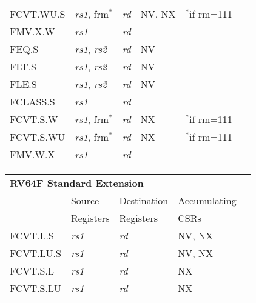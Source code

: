 \begin{tabular}{p{3cm}|p{25mm}|p{3cm}|p{4cm}|p{4cm}}
   \cline{2-4}
   FCVT.WU.S & {\em rs1}, frm$^*$ & {\em rd} & NV, NX & $^*$if rm=111  \\
   \cline{2-4}
   FMV.X.W & {\em rs1} & {\em rd} &   & \\
   \cline{2-4}
   FEQ.S & {\em rs1}, {\em rs2} & {\em rd} & NV &   \\
   \cline{2-4}
   FLT.S & {\em rs1}, {\em rs2} & {\em rd} & NV &   \\
   \cline{2-4}
   FLE.S & {\em rs1}, {\em rs2} & {\em rd} & NV &   \\
   \cline{2-4}
   FCLASS.S & {\em rs1} & {\em rd} &   & \\
   \cline{2-4}
   FCVT.S.W & {\em rs1}, frm$^*$ & {\em rd} & NX & $^*$if rm=111  \\
   \cline{2-4}
   FCVT.S.WU & {\em rs1}, frm$^*$ & {\em rd} & NX & $^*$if rm=111  \\
   \cline{2-4}
   FMV.W.X & {\em rs1} & {\em rd} &   & \\
   \cline{2-4}
\end{tabular}

\begin{tabular}{p{3cm}|p{25mm}|p{3cm}|p{4cm}|p{4cm}}
  \multicolumn{4}{l}{\bf RV64F Standard Extension} \\
  \cline{2-4}
   & Source    & Destination & Accumulating \\
   & Registers & Registers   & CSRs \\
  \cline{2-4}
   FCVT.L.S & {\em rs1} & {\em rd} & NV, NX &   \\
   \cline{2-4}
   FCVT.LU.S & {\em rs1} & {\em rd} & NV, NX &   \\
   \cline{2-4}
   FCVT.S.L & {\em rs1} & {\em rd} & NX &   \\
   \cline{2-4}
   FCVT.S.LU & {\em rs1} & {\em rd} & NX &   \\
   \cline{2-4}
\end{tabular}

